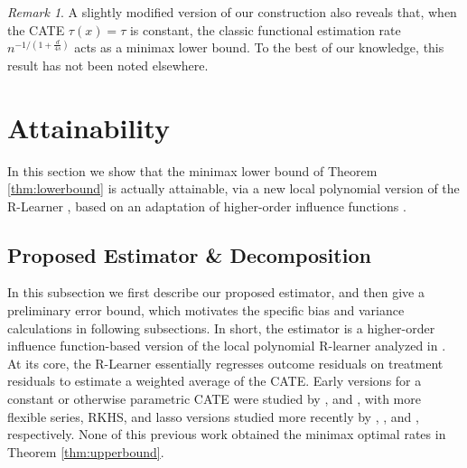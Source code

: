 \documentclass[11pt,twoside]{article}
\theoremstyle{definition}
\theoremstyle{remark}
\newtheorem{remark}{Remark}
\begin{document}
\begin{remark}
A slightly modified version of our construction also reveals that, when the CATE $\tau(x)=\tau$ is constant, the classic functional estimation rate $n^{-1/\left(1 + \frac{d}{4s}\right)}$ acts as a minimax lower bound. To the best of our knowledge, this result has not been noted elsewhere. \\
\end{remark}

\section{Attainability}
\label{sec:upperbound}


In this section we show that the minimax lower bound of Theorem \ref{thm:lowerbound} is actually attainable, via a new local polynomial version of the R-Learner \citep{nie2017quasi, kennedy2023towards}, based on an adaptation of higher-order influence functions \citep{robins2008higher, robins2009quadratic, robins2017minimax}.  \\


\subsection{Proposed Estimator \& Decomposition}

In this subsection we first describe our proposed estimator, and then give a preliminary error bound, which motivates the specific bias and variance calculations in following subsections. In short, the estimator is a higher-order influence function-based version of the local polynomial R-learner analyzed in \citet{kennedy2023towards}. At its core, the R-Learner essentially regresses outcome residuals on treatment residuals to estimate a weighted average of the CATE. Early versions for a constant or otherwise parametric CATE were studied by \citet{chamberlain1987asymptotic, robinson1988root}, and \citet{robins1994correcting}, with more flexible series, RKHS, and lasso versions studied more recently by \citet{robins2008higher}, \citet{nie2017quasi}, and \citet{chernozhukov2017orthogonal}, respectively. None of this previous work obtained the minimax optimal rates in Theorem \ref{thm:upperbound}.  \\
\end{document}
